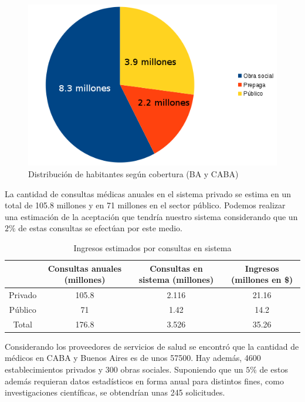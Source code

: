 \documentclass[a4paper,10pt]{article}
\begin{document}
\begin{center}
\begin{figure}[H]
\centering
\includegraphics[width=1\textwidth]{./Imagenes/g1.png}
\caption{Distribución de habitantes según cobertura (BA y CABA)}
\label{fig:hp}
\end{figure}
\end{center}

La cantidad de consultas médicas anuales en el sistema privado se estima en un total de 105.8 millones y en 71 millones en el sector público. Podemos realizar una estimación de la aceptación que tendría nuestro sistema considerando que un $2\%$ de estas consultas se efectúan por este medio.

\begin{table} [H]
\begin{center}
\begin{tabular}{|c|c|c|c|}
\hline
		&Consultas anuales (millones)	&Consultas en sistema (millones)	&Ingresos (millones en \$)\\\hline
Privado	&105.8							&2.116								&21.16\\\hline
Público	&71								&1.42								&14.2\\\hline
Total	&176.8							&3.526								&35.26\\\hline
\end{tabular}
\end{center}
\caption{Ingresos estimados por consultas en sistema}
\end{table}

Considerando los proveedores de servicios de salud se encontró que la cantidad de médicos en CABA y Buenos Aires es de unos 57500. Hay además, 4600 establecimientos privados y 300 obras sociales. Suponiendo que un $5\%$ de estos además requieran datos estadísticos en forma anual para distintos fines, como investigaciones científicas, se obtendrían unas 245 solicitudes.
\end{document}
